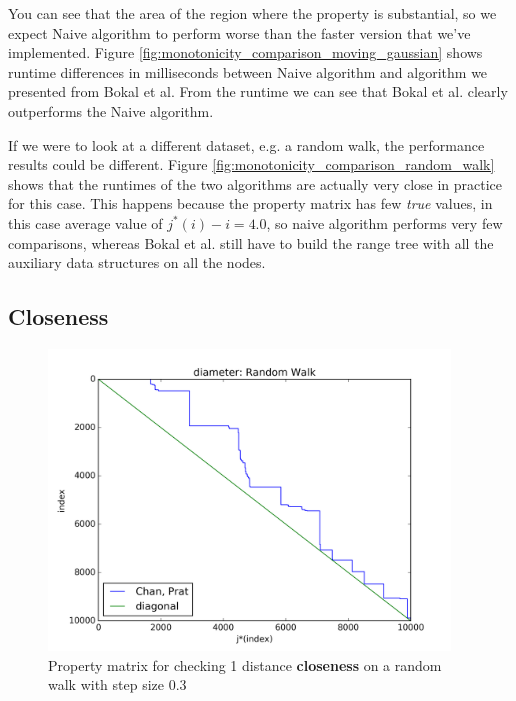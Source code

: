 \documentclass{article}
\begin{document}
You can see that the area of the region where the property is
substantial, so we expect Naive algorithm to perform worse than the
faster version that we've implemented.  Figure
\ref{fig:monotonicity_comparison_moving_gaussian} shows runtime
differences in milliseconds between Naive algorithm and algorithm
we presented from Bokal et al. From the runtime we can see that
Bokal et al. clearly outperforms the Naive algorithm.

If we were to look at a different dataset, e.g. a random walk, the
performance results could be different. Figure
\ref{fig:monotonicity_comparison_random_walk} shows that the runtimes
of the two algorithms are actually very close in practice for this
case. This happens because the property matrix has few \textit{true}
values, in this case average value of $j^*(i) - i = 4.0$, so naive
algorithm performs very few comparisons, whereas Bokal et al. still
have to build the range tree with all the auxiliary data structures
on all the nodes.


\subsection{Closeness}
\label{sec:experiments:closeness}


\begin{figure}[!ht]
  \centering
  \includegraphics[height=8cm]{../plots/diameter_random_walk}
  \caption{Property matrix for checking 1 distance \textbf{closeness}
  on a random walk with step size 0.3}
  \label{fig:diameter_demo}
\end{figure}
\end{document}
